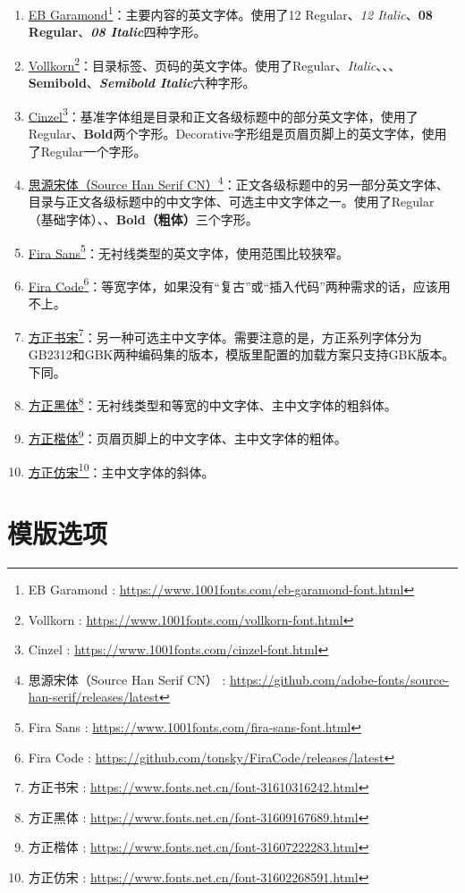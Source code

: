 \documentclass[10pt,openany]{book}
\newcommand{\link}[2]{\href{#1}{#2}\footnote{#2 : \href{#1}{#1}}}
\begin{document}
\begin{enumerate}
    \item \link{https://www.1001fonts.com/eb-garamond-font.html}{EB Garamond}：主要内容的英文字体。使用了12 Regular、\textit{12 Italic}、\textbf{08 Regular}、\textbf{\textit{08 Italic}}四种字形。
    \item \link{https://www.1001fonts.com/vollkorn-font.html}{Vollkorn}：目录标签、页码的英文字体。使用了Regular、\textit{Italic}、、、\textbf{Semibold}、\textbf{\textit{Semibold Italic}}六种字形。\titlefont\scshape
    \item \link{https://www.1001fonts.com/cinzel-font.html}{Cinzel}：基准字体组是目录和正文各级标题中的部分英文字体，使用了Regular、\textbf{Bold}两个字形。\upshape\infofont Decorative字形组是页眉页脚上的英文字体，使用了Regular一个字形。\titlefont
    \item \link{https://github.com/adobe-fonts/source-han-serif/releases/latest}{思源宋体（Source Han Serif CN）}：正文各级标题中的另一部分英文字体、目录与正文各级标题中的中文字体、可选主中文字体之一。使用了Regular（基础字体）、、\textbf{Bold（粗体）}三个字形。\sffamily
    \item \link{https://www.1001fonts.com/fira-sans-font.html}{Fira Sans}：无衬线类型的英文字体，使用范围比较狭窄。\ttfamily
    \item \link{https://github.com/tonsky/FiraCode/releases/latest}{Fira Code}：等宽字体，如果没有“复古”或“插入代码”两种需求的话，应该用不上。\rmfamily\shusong
    \item \link{https://www.fonts.net.cn/font-31610316242.html}{方正书宋}：另一种可选主中文字体。需要注意的是，方正系列字体分为GB2312和GBK两种编码集的版本，模版里配置的加载方案只支持GBK版本。下同。\sffamily
    \item \link{https://www.fonts.net.cn/font-31609167689.html}{方正黑体}：无衬线类型和等宽的中文字体、主中文字体的粗斜体。\infofont
    \item \link{https://www.fonts.net.cn/font-31607222283.html}{方正楷体}：页眉页脚上的中文字体、主中文字体的粗体。\rmfamily\itshape
    \item \link{https://www.fonts.net.cn/font-31602268591.html}{方正仿宋}：主中文字体的斜体。\upshape
\end{enumerate}

\chapter{模版选项}
\end{document}
